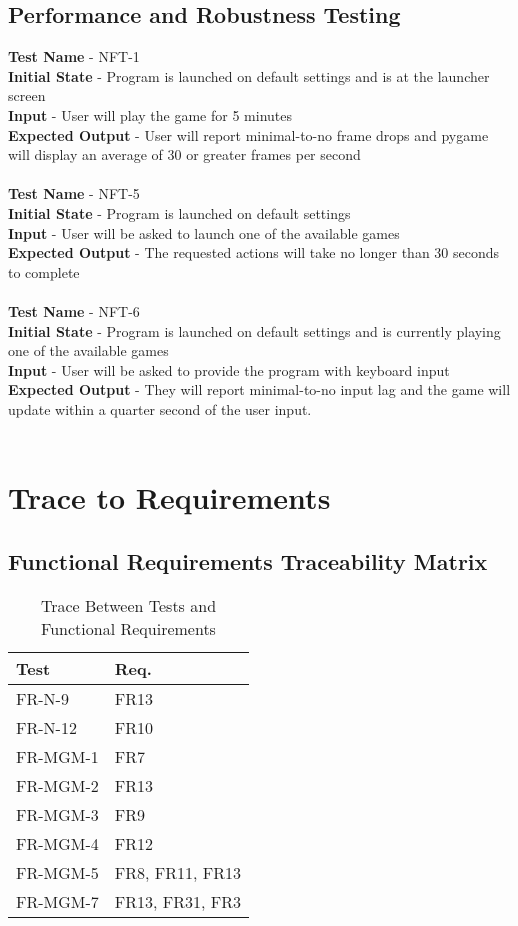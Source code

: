 \documentclass[12pt, titlepage]{article}
\begin{document}
\subsection{Performance and Robustness Testing}
\textbf{Test Name} - NFT-1\\
\textbf{Initial State} - Program is launched on default settings and is at the launcher screen \\
\textbf{Input} - User will play the game for 5 minutes\\
\textbf{Expected Output} - User will report minimal-to-no frame drops and pygame will display an average of 30 or greater frames per second\\ \\ 
\textbf{Test Name} - NFT-5\\
\textbf{Initial State} - Program is launched on default settings\\
\textbf{Input} - User will be asked to launch one of the available games\\
\textbf{Expected Output} - The requested actions will take no longer than 30 seconds to complete\\ \\ 
\textbf{Test Name} - NFT-6\\
\textbf{Initial State} - Program is launched on default settings and is currently playing one of the available games\\
\textbf{Input} - User will be asked to provide the program with keyboard input\\
\textbf{Expected Output} - They will report minimal-to-no input lag and the game will update within a quarter second of the user input.\\ \\ 

\section{Trace to Requirements}	

\subsection{Functional Requirements Traceability Matrix}
\begin{table}[H]
\centering
\begin{tabular}{p{} p{}}
\toprule
\textbf{Test} & \textbf{Req.}\\
\midrule
FR-N-9 & FR13\\
FR-N-12 & FR10\\
FR-MGM-1 & FR7\\
FR-MGM-2 & FR13\\
FR-MGM-3 & FR9\\
FR-MGM-4 & FR12\\
FR-MGM-5 & FR8, FR11, FR13\\
FR-MGM-7 & FR13, FR31, FR3\\
\bottomrule
\end{tabular}
\caption{Trace Between Tests and Functional Requirements}
\label{TblTFR}
\end{table}
\end{document}
